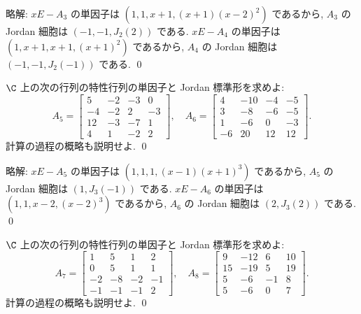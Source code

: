 \documentclass[12pt,twoside]{jarticle}
\newcommand\commentout[1]{#1}
\newcommand\commentout[1]{}
\begin{document}
\commentout{
\noindent
略解: $xE-A_3$ の単因子は $(1,1,x+1,(x+1)(x-2)^2)$ であるから,
$A_3$ の Jordan 細胞は $(-1,-1,J_2(2))$ である.
$xE-A_4$ の単因子は $(1,x+1,x+1,(x+1)^2)$ であるから,
$A_4$ の Jordan 細胞は $(-1,-1,J_2(-1))$ である.
\qed
}


\begin{question}
\label{q:ed-j-3}
  $\C$ 上の次の行列の特性行列の単因子と Jordan 標準形を求めよ:
  \begin{equation*}
    A_5 = \left[ 
      \begin{array}{rrrr}
        5 & -2 & -3 & 0 \\
        -4 & -2 & 2 & -3 \\
        12 & -3 & -7 & 1 \\
        4 & 1 & -2 & 2
      \end{array}
    \right],
    \quad
    A_6 = \left[ 
      \begin{array}{rrrr}
        4 & -10 & -4 & -5 \\
        3 & -8 & -6 & -5 \\
        1 & -6 & 0 & -3 \\
        -6 & 20 & 12 & 12
      \end{array}
    \right].
  \end{equation*}
  計算の過程の概略も説明せよ. \qed
\end{question}

\commentout{
\noindent
略解: $xE-A_5$ の単因子は $(1,1,1,(x-1)(x+1)^3)$ であるから,
$A_5$ の Jordan 細胞は $(1,J_3(-1))$ である.
$xE-A_6$ の単因子は $(1,1,x-2,(x-2)^3)$ であるから,
$A_6$ の Jordan 細胞は $(2,J_3(2))$ である.
\qed
}


\begin{question}
\label{q:ed-j-4}
  $\C$ 上の次の行列の特性行列の単因子と Jordan 標準形を求めよ:
  \begin{equation*}
    A_7 = \left[ 
      \begin{array}{rrrr}
        1 & 5 & 1 & 2 \\
        0 & 5 & 1 & 1 \\
        -2 & -8 & -2 & -1 \\
        -1 & -1 & -1 & 2
      \end{array}
    \right],
    \quad
    A_8 = \left[ 
      \begin{array}{rrrr}
        9 & -12 & 6 & 10 \\
        15 & -19 & 5 & 19 \\
        5 & -6 & -1 & 8 \\
        5 & -6 & 0 & 7
      \end{array}
    \right].
  \end{equation*}
  計算の過程の概略も説明せよ. \qed
\end{question}
\end{document}
